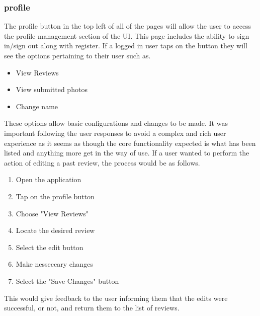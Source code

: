 \documentclass{article}
\begin{document}
\subsubsection{profile}
The profile button in the top left of all of the pages will allow the user to access the profile management section of the UI.
This page includes the ability to sign in/sign out along with register.
If a logged in user taps on the button they will see the options pertaining to their user such as.
\begin{itemize}
	\item View Reviews
	\item View submitted photos
	\item Change name
\end{itemize}
These options allow basic configurations and changes to be made.
It was important following the user responses to avoid a complex and rich user experience as it seems as though the core functionality expected is what has been listed and anything more get in the way of use.
If a user wanted to perform the action of editing a past review, the process would be as follows.
\begin{enumerate}
	\item Open the application
	\item Tap on the profile button
	\item Choose "View Reviews"
	\item Locate the desired review
	\item Select the edit button
	\item Make nesseccary changes
	\item Select the "Save Changes" button
\end{enumerate}
This would give feedback to the user informing them that the edits were successful, or not, and return them to the list of reviews.
\end{document}
